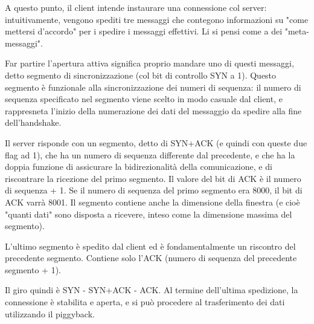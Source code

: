             \vspace{3mm}
                
            A questo punto, il client intende instaurare una connessione col server: intuitivamente, vengono spediti tre messaggi che contegono informazioni su "come mettersi d'accordo" per i spedire i messaggi effettivi. Li si pensi come a dei "meta-messaggi".
                
            \vspace{3mm}
                
            Far partire l'apertura attiva significa proprio mandare uno di questi messaggi, detto segmento di sincronizzazione (col bit di controllo SYN a 1). Questo segmento è funzionale alla sincronizzazione dei numeri di sequenza: il numero di sequenza specificato nel segmento viene scelto in modo casuale dal client, e rappresneta l'inizio della numerazione dei dati del messaggio da spedire alla fine dell'handshake.
                
            \vspace{3mm}
                
            Il server risponde con un segmento, detto di SYN+ACK (e quindi con queste due flag ad 1), che ha un numero di sequenza differente dal precedente, e che ha la doppia funzione di assicurare la bidirezionalità della comunicazione, e di riscontrare la ricezione del primo segmento. Il valore del bit di ACK è il numero di sequenza + 1. Se il numero di sequenza del primo segmento era 8000, il bit di ACK varrà 8001. Il segmento contiene anche la dimensione della finestra (e cioè "quanti dati" sono disposta a ricevere, inteso come la dimensione massima del segmento).
                
            \vspace{3mm}
                
            L'ultimo segmento è spedito dal client ed è fondamentalmente un riscontro del precedente segmento. Contiene solo l'ACK (numero di sequenza del precedente segmento + 1).
                
            \vspace{3mm}
                
            Il giro quindi è SYN - SYN+ACK - ACK. Al termine dell'ultima spedizione, la connessione è stabilita e aperta, e si può procedere al trasferimento dei dati utilizzando il piggyback.
            
        
